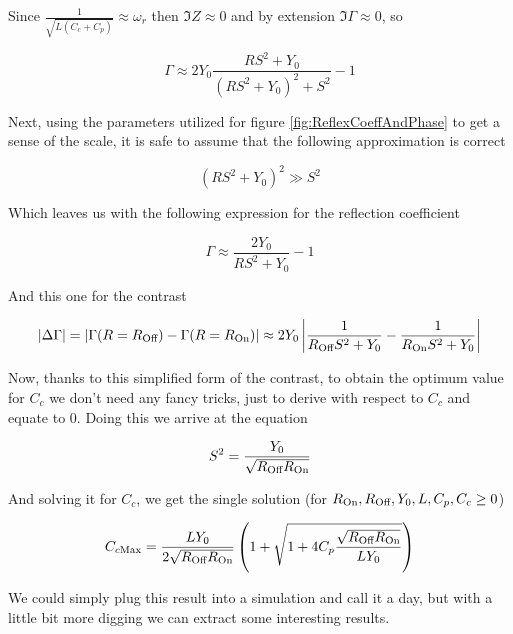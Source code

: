 \documentclass[../main.tex]{subfiles}
\begin{document}
Since \(\frac{1}{\sqrt{L (C_{c} + C_{p})}} \approx \omega_{r}\) then
\(\Im Z \approx 0\) and by extension \(\Im \Gamma \approx 0\), so

\begin{equation}
    \Gamma \approx 2 Y_{0}\frac{RS^2 + Y_{0}}{(RS^2 + Y_{0})^2 + S^2} - 1
\end{equation}

Next, using the parameters utilized for figure \ref{fig:ReflexCoeffAndPhase}
to get a sense of the scale, it is safe to assume that the following
approximation is correct

\begin{equation}
\label{eq:ParallelContrAprox}
    (RS^2 + Y_{0})^2 \gg S^2
\end{equation}

Which leaves us with the following expression for the reflection coefficient

\begin{equation}
\label{eq:ApproxReflecCoeff}
    \Gamma \approx \frac{2Y_{0}}{RS^2 + Y_{0}} - 1
\end{equation}

And this one for the contrast

\begin{equation}
\label{eq:ParallelContr}
    |\Delta\Gamma| = |\Gamma(R=R_{\text{Off}}) - \Gamma(R=R_{\text{On}})|
                   \approx 2Y_{0}\left|\frac{1}{
                   R_{\text{Off}} S^2 + Y_{0}} - \frac{1}{R_{\text{On}} S^2 + Y_{0}
               }\right|
\end{equation}

Now, thanks to this simplified form of the contrast, to obtain the optimum
value for \(C_{c}\) we don't need any fancy tricks, just to derive with respect
to \(C_{c}\) and equate to \(0\). Doing this we arrive at the equation

\begin{equation}
\label{eq:ParallelContrOptS2NonRho}
    S^2 = \frac{Y_{0}}{\sqrt{R_{\text{Off}}R_{\text{On}}}}
\end{equation}

And solving it for \(C_{c}\), we get the single solution
(for \(R_{\text{On}}, R_{\text{Off}}, Y_{0}, L, C_{p}, C_{c} \geq 0\))

\begin{equation}
\label{eq:ParallelContrOptCcNonRho}
C_{c\text{Max}} = \frac{L Y_{0}}{2\sqrt{R_{\text{Off}}R_{\text{On}}}}
\left(1 + \sqrt{1 + 4C_{p}\frac{\sqrt{R_{\text{Off}}R_{\text{On}}}}{LY_{0}}}\right)
\end{equation}

We could simply plug this result into a simulation and call it a day, but with
a little bit more digging we can extract some interesting results.
\end{document}
